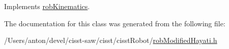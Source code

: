 Implements \hyperlink{classrob_kinematics_afbfe67b8baaed6fdee85bef681f195e1}{rob\+Kinematics}.



The documentation for this class was generated from the following file\+:\begin{DoxyCompactItemize}
\item 
/\+Users/anton/devel/cisst-\/saw/cisst/cisst\+Robot/\hyperlink{rob_modified_hayati_8h}{rob\+Modified\+Hayati.\+h}\end{DoxyCompactItemize}
